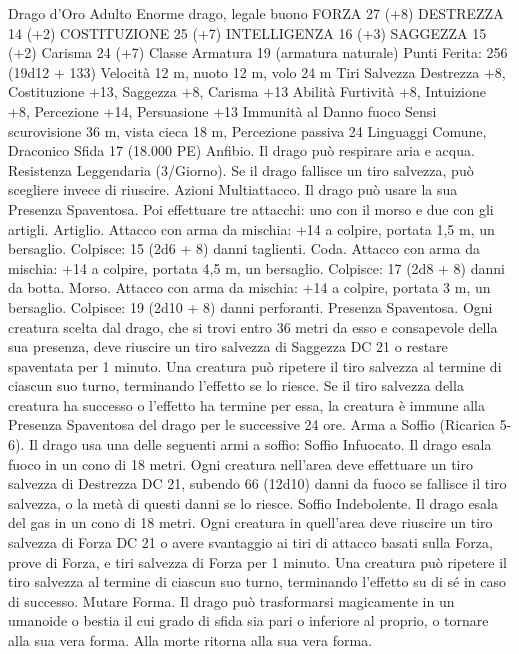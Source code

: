 \begin{multicols}{2}
Drago d’Oro Adulto
Enorme drago, legale buono
FORZA 27 (+8)
DESTREZZA 14 (+2)
COSTITUZIONE 25 (+7)
INTELLIGENZA 16 (+3)
SAGGEZZA 15 (+2)
Carisma 24 (+7)
Classe Armatura 19 (armatura naturale)
\hspace*{0pt}\hfill{Punti Ferita}: 256 (19d12 + 133)
Velocità 12 m, nuoto 12 m, volo 24 m
Tiri Salvezza Destrezza +8, Costituzione +13, Saggezza +8,
Carisma +13
Abilità Furtività +8, Intuizione +8, Percezione +14, Persuasione +13
Immunità al Danno fuoco
Sensi scurovisione 36 m, vista cieca 18 m, Percezione passiva 24
Linguaggi Comune, Draconico
Sfida 17 (18.000 PE)
Anfibio. Il drago può respirare aria e acqua.
Resistenza Leggendaria (3/Giorno). Se il drago fallisce un tiro
salvezza, può scegliere invece di riuscire.
Azioni
Multiattacco. Il drago può usare la sua Presenza Spaventosa. Poi
effettuare tre attacchi: uno con il morso e due con gli artigli.
Artiglio. Attacco con arma da mischia: +14 a colpire, portata 1,5
m, un bersaglio.
Colpisce: 15 (2d6 + 8) danni taglienti.
Coda. Attacco con arma da mischia: +14 a colpire, portata 4,5
m, un bersaglio.
Colpisce: 17 (2d8 + 8) danni da botta.
Morso. Attacco con arma da mischia: +14 a colpire, portata 3 m,
un bersaglio.
Colpisce: 19 (2d10 + 8) danni perforanti.
Presenza Spaventosa. Ogni creatura scelta dal drago, che si trovi
entro 36 metri da esso e consapevole della sua presenza, deve
riuscire un tiro salvezza di Saggezza DC 21 o restare spaventata per
1 minuto. Una creatura può ripetere il tiro salvezza al termine di
ciascun suo turno, terminando l’effetto se lo riesce. Se il tiro salvezza
della creatura ha successo o l’effetto ha termine per essa, la creatura è
immune alla Presenza Spaventosa del drago per le successive 24 ore.
Arma a Soffio (Ricarica 5-6). Il drago usa una delle seguenti armi
a soffio:
Soffio Infuocato. Il drago esala fuoco in un cono di 18 metri. Ogni
creatura nell’area deve effettuare un tiro salvezza di Destrezza DC
21, subendo 66 (12d10) danni da fuoco se fallisce il tiro salvezza, o
la metà di questi danni se lo riesce.
Soffio Indebolente. Il drago esala del gas in un cono di 18 metri. Ogni
creatura in quell’area deve riuscire un tiro salvezza di Forza DC 21 o
avere svantaggio ai tiri di attacco basati sulla Forza, prove di Forza, e
tiri salvezza di Forza per 1 minuto. Una creatura può ripetere il tiro
salvezza al termine di ciascun suo turno, terminando l’effetto su di sé
in caso di successo.
Mutare Forma. Il drago può trasformarsi magicamente in un
umanoide o bestia il cui grado di sfida sia pari o inferiore al proprio,
o tornare alla sua vera forma. Alla morte ritorna alla sua vera forma.

\end{multicols}
